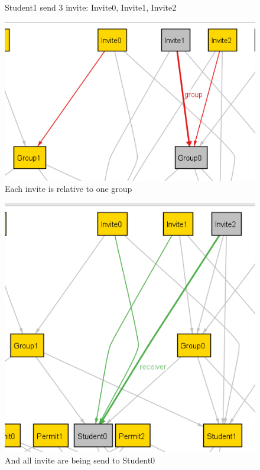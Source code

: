 \documentclass{article}
\begin{document}
{\begin{figure}[H]
        \caption{Student1 send 3 invite: Invite0, Invite1, Invite2}
        \label{fig:sending invite}
    \end{figure}
    \begin{figure}[H]
        \centering
        \includegraphics{images/ALLOY/group.png}
        \caption{Each invite is relative to one group}
        \label{fig:group invite}
    \end{figure}
    \begin{figure}[H]
        \centering
        \includegraphics[scale=0.85]{images/ALLOY/receiver.png}
        \caption{And all invite are being send to Student0}

\end{figure}}
\end{document}
